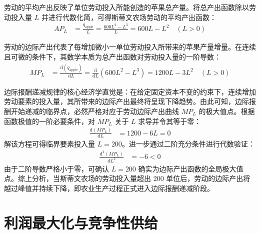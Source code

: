\begin{enumerate}[label=\textbf{\arabic*.}, leftmargin=*]
		劳动的平均产出反映了单位劳动投入所能创造的苹果总产量。将总产出函数除以劳动投入量 $L$ 并进行代数化简，可得斯蒂文农场劳动的平均产出函数：
		\[
		\begin{aligned}
			AP_L &= \frac{q_{\text{apple}}}{L} = \frac{600L^2 - L^3}{L} = 600L - L^2 \quad (L > 0)
		\end{aligned}
		\]
		
		劳动的边际产出代表了每增加微小一单位劳动投入所带来的苹果产量增量。在连续且可微的条件下，其数学本质为总产出函数对劳动投入量的一阶导数：
		\[
		\begin{aligned}
			MP_L &= \frac{\mathrm{d}(q_{\text{apple}})}{\mathrm{d}L} = \frac{\mathrm{d}}{\mathrm{d}L}(600L^2 - L^3) = 1200L - 3L^2 \quad (L > 0)
		\end{aligned}
		\]
		
		边际报酬递减规律的核心经济学直觉是：在给定固定资本不变的约束下，连续增加劳动要素的投入量，其所带来的边际产出最终将呈现下降趋势。由此可知，边际报酬开始递减的临界点，必然严格对应于劳动边际产出曲线 $MP_L$ 的极大值点。根据函数极值的一阶必要条件，对 $MP_L$ 关于 $L$ 求导并令其等于零：
		\[
		\begin{aligned}
			\frac{\mathrm{d}(MP_L)}{\mathrm{d}L} &= 1200 - 6L = 0
		\end{aligned}
		\]
		解该方程可得临界要素投入量 $L = 200$。进一步通过二阶充分条件进行代数验证：
		\[
		\begin{aligned}
			\frac{\mathrm{d}^2(MP_L)}{\mathrm{d}L^2} &= -6 < 0
		\end{aligned}
		\]
		由于二阶导数严格小于零，可确认 $L=200$ 确实为边际产出函数的全局极大值点。综上分析，当斯蒂文农场的劳动投入量超出 $200$ 单位后，劳动的边际产出将越过峰值并持续下降，即农业生产过程正式进入边际报酬递减阶段。
	\end{enumerate}
	\chapter{利润最大化与竞争性供给}
	

